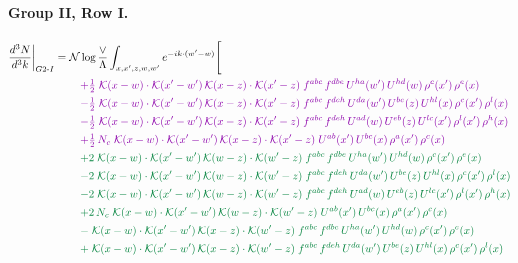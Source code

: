 \documentclass[10pt]{article}
\numberwithin{equation}{section}
\newcommand{\NN}{\mathcal N\log\frac{\vee}{\Lambda}}
\begin{document}
\paragraph{Group II, Row I.}
\begin{align}
\frac{d^3N}{d^3k}\bigg|_{G2\text{-}I}={}&\NN\int_{x,x',z,w,w'}e^{-ik\cdot(w'-w)}\Bigg[\notag\\
&\quad{\color{CC}+\tfrac{1}{2}\;\mathcal{K}(x-w)\cdot\mathcal{K}(x'-w')\,\mathcal{K}(x-z)\cdot\mathcal{K}(x'-z)\;f^{abc}\,f^{dbe}\,U^{ha}(w')\,U^{hd}(w)\,\rho^{c}(x')\,\rho^{e}(x)}\notag\\
&\quad{\color{CC}-\tfrac{1}{2}\;\mathcal{K}(x-w)\cdot\mathcal{K}(x'-w')\,\mathcal{K}(x-z)\cdot\mathcal{K}(x'-z)\;f^{abc}\,f^{deh}\,U^{da}(w')\,U^{be}(z)\,U^{hl}(x)\,\rho^{c}(x')\,\rho^{l}(x)}\notag\\
&\quad{\color{CC}-\tfrac{1}{2}\;\mathcal{K}(x-w)\cdot\mathcal{K}(x'-w')\,\mathcal{K}(x-z)\cdot\mathcal{K}(x'-z)\;f^{abc}\,f^{deh}\,U^{ad}(w)\,U^{eb}(z)\,U^{lc}(x')\,\rho^{l}(x')\,\rho^{h}(x)}\notag\\
&\quad{\color{CC}+\tfrac{1}{2}\,N_c\;\mathcal{K}(x-w)\cdot\mathcal{K}(x'-w')\,\mathcal{K}(x-z)\cdot\mathcal{K}(x'-z)\;U^{ab}(x')\,U^{bc}(x)\,\rho^{a}(x')\,\rho^{c}(x)}\notag\\
&\quad{\color{JIM}+2\;\mathcal{K}(x-w)\cdot\mathcal{K}(x'-w')\,\mathcal{K}(w-z)\cdot\mathcal{K}(w'-z)\;f^{abc}\,f^{dbe}\,U^{ha}(w')\,U^{hd}(w)\,\rho^{c}(x')\,\rho^{e}(x)}\notag\\
&\quad{\color{JIM}-2\;\mathcal{K}(x-w)\cdot\mathcal{K}(x'-w')\,\mathcal{K}(w-z)\cdot\mathcal{K}(w'-z)\;f^{abc}\,f^{deh}\,U^{da}(w')\,U^{be}(z)\,U^{hl}(x)\,\rho^{c}(x')\,\rho^{l}(x)}\notag\\
&\quad{\color{JIM}-2\;\mathcal{K}(x-w)\cdot\mathcal{K}(x'-w')\,\mathcal{K}(w-z)\cdot\mathcal{K}(w'-z)\;f^{abc}\,f^{deh}\,U^{ad}(w)\,U^{eb}(z)\,U^{lc}(x')\,\rho^{l}(x')\,\rho^{h}(x)}\notag\\
&\quad{\color{JIM}+2\,N_c\;\mathcal{K}(x-w)\cdot\mathcal{K}(x'-w')\,\mathcal{K}(w-z)\cdot\mathcal{K}(w'-z)\;U^{ab}(x')\,U^{bc}(x)\,\rho^{a}(x')\,\rho^{c}(x)}\notag\\
&\quad{\color{JIM}-\;\mathcal{K}(x-w)\cdot\mathcal{K}(x'-w')\,\mathcal{K}(x-z)\cdot\mathcal{K}(w'-z)\;f^{abc}\,f^{dbe}\,U^{ha}(w')\,U^{hd}(w)\,\rho^{c}(x')\,\rho^{e}(x)}\notag\\
&\quad{\color{JIM}+\;\mathcal{K}(x-w)\cdot\mathcal{K}(x'-w')\,\mathcal{K}(x-z)\cdot\mathcal{K}(w'-z)\;f^{abc}\,f^{deh}\,U^{da}(w')\,U^{be}(z)\,U^{hl}(x)\,\rho^{c}(x')\,\rho^{l}(x)}\notag\\

\end{align}
\end{document}
